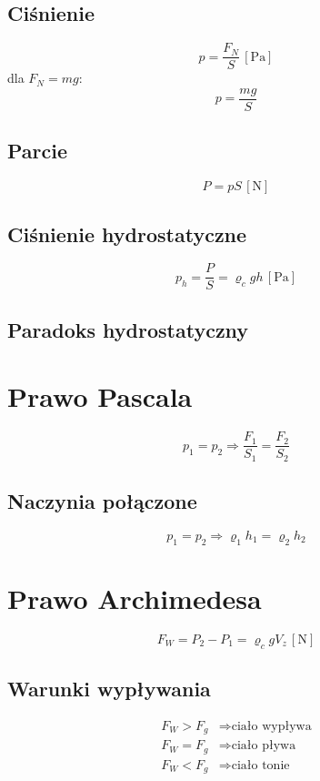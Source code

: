 \documentclass{report}
\numberwithin{equation}{chapter}
\newcommand{\unit}[1]{\,\left[\mathrm{#1}\right]}
\begin{document}
      \subsection{Ciśnienie}
        \begin{equation}
          p = \frac{F_N}{S} \unit{Pa}
        \end{equation}
        dla $F_N = mg$:
        \begin{equation}
          p = \frac{mg}{S}
        \end{equation}
      \subsection{Parcie}
        \begin{equation}
          P = pS \unit{N}
        \end{equation}
      \subsection{Ciśnienie hydrostatyczne}
        \begin{equation}
          p_h = \frac{P}{S} = \varrho_cgh \unit{Pa}
        \end{equation}
      \subsection{Paradoks hydrostatyczny}
    \section{Prawo Pascala}
      \begin{equation}
        p_1 = p_2 \Rightarrow \frac{F_1}{S_1} = \frac{F_2}{S_2}
      \end{equation}
      \subsection{Naczynia połączone}
        \begin{equation}
          p_1 = p_2 \Rightarrow \varrho_1h_1 = \varrho_2h_2
        \end{equation}
    \section{Prawo Archimedesa}
      \begin{equation}
        F_W = P_2 - P_1 = \varrho_cgV_z \unit{N}
      \end{equation}
      \subsection{Warunki wypływania}
        \begin{align*}
          F_W > F_g &\Rightarrow \text{ciało wypływa}\\
          F_W = F_g &\Rightarrow \text{ciało pływa}\\
          F_W < F_g &\Rightarrow \text{ciało tonie}
        \end{align*}
\end{document}

